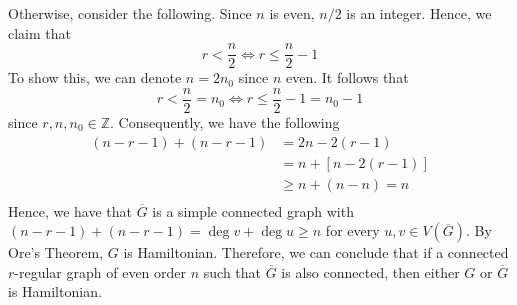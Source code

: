 \begin{hwproblem}{4}
  Otherwise, consider the following.
  Since \(n\) is even, \(n/2\) is an integer. Hence, we claim that 
  \[ r < \frac{n}{2} \iff r \leq \frac{n}{2} - 1 \]
  To show this, we can denote \(n = 2n_0\) since \(n\) even. It follows that 
  \[ r < \frac{n}{2} = n_0 \iff r \leq \frac{n}{2} - 1 = n_0 - 1 \]
  since \(r, n, n_0 \in \mathbb{Z}\). Consequently, we have the following
  \[
    \begin{aligned}
      (n-r-1) + (n-r-1) &= 2n - 2(r-1) \\ 
                        &= n + \left[n - 2(r-1)\right] \\ 
                        &\geq n + (n - n) = n \\
    \end{aligned}
  \]
  Hence, we have that \(\overline{G}\) is a simple connected graph with 
  \((n-r-1) + (n-r-1) = \deg v + \deg u \geq n\) for every \(u, v \in 
  V(\overline{G})\). By Ore's Theorem, \(G\) is Hamiltonian. Therefore, we
  can conclude that if a connected \(r\)-regular graph of even order \(n\) such
  that \(\overline{G}\) is also connected, then either \(G\) or \(\overline{G}\)
  is Hamiltonian.
\end{hwproblem}
